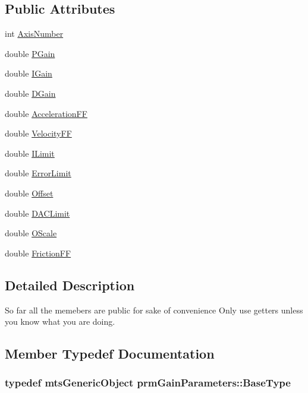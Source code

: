 \subsection*{Public Attributes}
\begin{DoxyCompactItemize}
\item 
int \hyperlink{classprm_gain_parameters_adfd1fc26fefbbca5905b842ba21ef5e5}{Axis\-Number}
\item 
double \hyperlink{classprm_gain_parameters_a60f5eb4771e850faf09e1adc277a9212}{P\-Gain}
\item 
double \hyperlink{classprm_gain_parameters_a91f63a293f7909483f494940eb1d670a}{I\-Gain}
\item 
double \hyperlink{classprm_gain_parameters_abee35d41aaebd76b9a496d801b5d6e0e}{D\-Gain}
\item 
double \hyperlink{classprm_gain_parameters_a0a99dca73c166449c7c1faa7f3772a4a}{Acceleration\-F\-F}
\item 
double \hyperlink{classprm_gain_parameters_a331e5f1371acaf30e54f13e0e243aa0a}{Velocity\-F\-F}
\item 
double \hyperlink{classprm_gain_parameters_acd427789e5a948a9fb4ebbcc6e6d9ff4}{I\-Limit}
\item 
double \hyperlink{classprm_gain_parameters_aa15f34c2aa2670d0476950d87579b826}{Error\-Limit}
\item 
double \hyperlink{classprm_gain_parameters_a32c8ddbf1415970e0f77d53bf48e6274}{Offset}
\item 
double \hyperlink{classprm_gain_parameters_a0b3cf9565acad495fb3fc0b82a97ab4d}{D\-A\-C\-Limit}
\item 
double \hyperlink{classprm_gain_parameters_ab99c3badf541dcb2ed494281917cd9df}{O\-Scale}
\item 
double \hyperlink{classprm_gain_parameters_ae30ef66f5c7b7172cabd23696b3d222a}{Friction\-F\-F}
\end{DoxyCompactItemize}


\subsection{Detailed Description}
So far all the memebers are public for sake of convenience Only use getters unless you know what you are doing. 

\subsection{Member Typedef Documentation}
\hypertarget{classprm_gain_parameters_ac13e32cd34eafe7bd371cf0fe7735838}{
\subsubsection[{Base\-Type}]{\setlength{\rightskip}{0pt plus 5cm}typedef {\bf mts\-Generic\-Object} {\bf prm\-Gain\-Parameters\-::\-Base\-Type}}}\label{classprm_gain_parameters_ac13e32cd34eafe7bd371cf0fe7735838}


